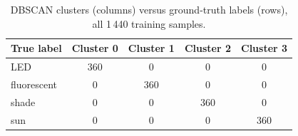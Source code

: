 
\begin{table}[!ht]
  \centering
  \caption{DBSCAN clusters (columns) versus ground-truth labels (rows), all 1\,440 training samples.}
  \label{tab:confusion}
  \begin{tabular}{lcccc}
    \hline
    True label & Cluster 0 & Cluster 1 & Cluster 2 & Cluster 3\\
    \hline
    LED         & 360 & 0 & 0 & 0\\
    fluorescent & 0 & 360 & 0 & 0\\
    shade       & 0 & 0 & 360 & 0\\
    sun         & 0 & 0 & 0 & 360\\
    \hline
  \end{tabular}
\end{table}